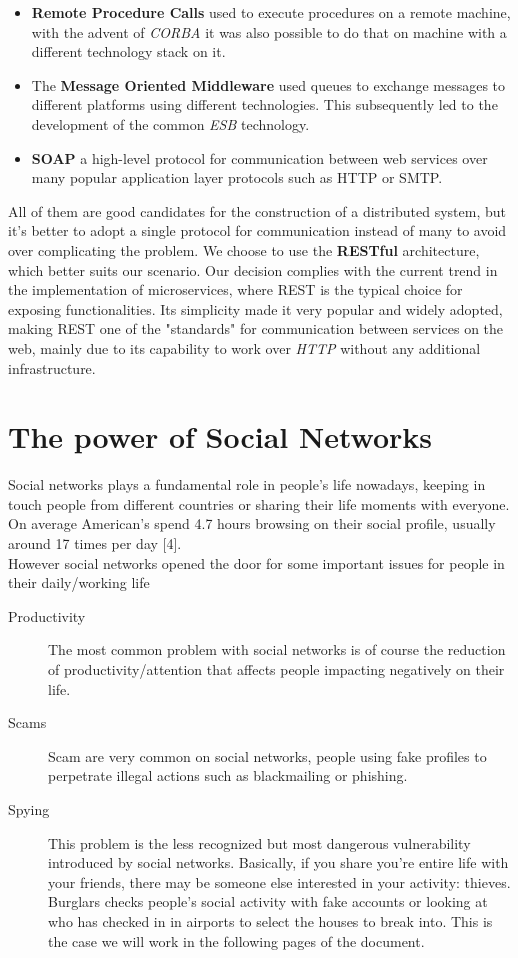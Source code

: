 \begin{itemize}
  \item \textbf{Remote Procedure Calls} used to execute procedures on a remote machine,
  with the advent of \textit{CORBA} it was also possible to do that on machine
  with a different technology stack on it.
  \item The \textbf{Message Oriented Middleware} used queues to exchange messages to
  different platforms using different technologies. This subsequently led to
  the development of the common \textit{ESB} technology.
  \item \textbf{SOAP} a high-level protocol for communication between web services
  over many popular application layer protocols such as HTTP or SMTP.
\end{itemize}

All of them are good candidates for the construction of a distributed system,
but it's better to adopt a single protocol for communication instead of many to
avoid over complicating the problem.
We choose to use the \textbf{RESTful} architecture, which
better suits our scenario. Our decision complies with the current trend in the
implementation of microservices, where REST is the typical choice for exposing
functionalities. Its simplicity made it very popular and widely adopted, making
REST one of the "standards" for communication between services on the web, mainly
due to its capability to work over \textit{HTTP} without any additional infrastructure.





\section{The power of Social Networks}

Social networks plays a fundamental role in people's life nowadays,
keeping in touch people from different countries or sharing their life
moments with everyone. On average American's spend 4.7 hours browsing on their
social profile, usually around 17 times per day [4].\\
However social networks opened the door for some important issues for people in their
daily/working life
\begin{description}
    \item[Productivity] The most common problem with social networks is of course
    the reduction of productivity/attention that affects people impacting negatively on their life.
    \item[Scams] Scam are very common on social networks, people using fake profiles to perpetrate
    illegal actions such as blackmailing or phishing.
    \item[Spying] This problem is the less recognized but most dangerous vulnerability introduced by social networks.
    Basically, if you share you're entire life with your friends, there may be someone else interested in your activity: thieves.
    Burglars checks people's social activity with fake accounts or looking at who has checked in in airports to select the houses
    to break into. This is the case we will work in the following pages of the document.
\end{description}

